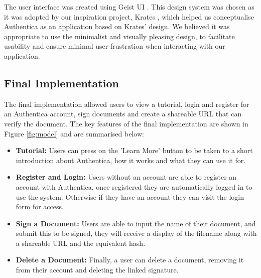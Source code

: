 \documentclass[a4,12pt]{article}
\begin{document}
The user interface was created using Geist UI \cite{geistui}. This design system was chosen as it was adopted by our inspiration project, Krates \cite{krates}, which helped us conceptualise Authentica as an application based on Krates' design. We believed it was appropriate to use the minimalist and visually pleasing design, to facilitate usability and ensure minimal user frustration when interacting with our application.

\subsection*{Final Implementation}

The final implementation allowed users to view a tutorial, login and register for an Authentica account, sign documents and create a shareable URL that can verify the document. The key features of the final implementation are shown in Figure \ref{fig:model} and are summarised below:

\begin{itemize}[leftmargin=*, label={}]
    \setlength\itemsep{0em}
    \item \textbf{Tutorial:} Users can press on the 'Learn More' button to be taken to a short introduction about Authentica, how it works and what they can use it for.
    \item \textbf{Register and Login:} Users without an account are able to register an account with Authentica, once registered they are automatically logged in to use the system. Otherwise if they have an account they can visit the login form for access.
    \item \textbf{Sign a Document:} Users are able to input the name of their document, and submit this to be signed, they will receive a display of the filename along with a shareable URL and the equivalent hash.
    \item \textbf{Delete a Document:} Finally, a user can delete a document, removing it from their account and deleting the linked signature.
\end{itemize}
\end{document}
